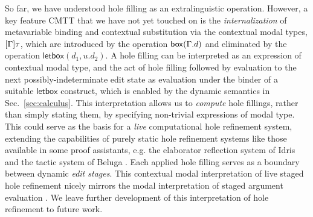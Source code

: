 So far, we have understood hole filling as an extralinguistic operation. However, a key feature CMTT that we have not yet touched on is the \emph{internalization} of metavariable binding and contextual substitution via the contextual modal types, $[\Gamma]\tau$, which are introduced by the operation $\mathsf{box}(\Gamma.d)$ and eliminated by the operation $\mathsf{letbox}(d_1, u.d_2)$. A hole filling can be interpreted as an expression of contextual modal type, and the act of hole filling followed by evaluation to the next possibly-indeterminate edit state as evaluation under the binder of a suitable $\mathsf{letbox}$ construct, which is enabled by the dynamic semantics in Sec.~\ref{sec:calculus}. This interpretation allows us to \emph{compute} hole fillings, rather than simply stating them, by specifying non-trivial expressions of modal type. This could serve as the basis for a \emph{live} computational hole refinement system, extending the capabilities of purely static hole refinement systems like those available in some proof assistants, e.g. the elaborator reflection system of Idris \cite{brady2013idris,DBLP:conf/icfp/ChristiansenB16} and the tactic system of Beluga \cite{DBLP:conf/flops/Pientka10,pientka2015inductive}. Each applied hole filling serves as a boundary between dynamic \emph{edit stages}. This contextual modal interpretation of live staged hole refinement nicely mirrors the modal interpretation of staged argument evaluation \cite{Davies:2001op}. We leave further development of this interpretation of hole refinement to future work.

